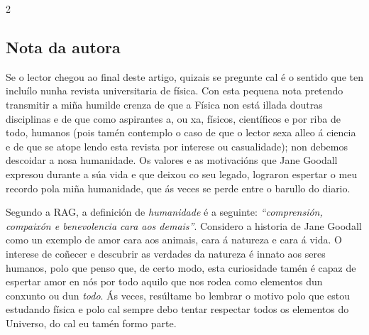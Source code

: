 \begin{multicols}{2}

\subsection*{Nota da autora}

Se o lector chegou ao final deste artigo, quizais se pregunte cal é o sentido
que ten incluílo nunha revista universitaria de física. Con esta pequena nota
pretendo transmitir a miña humilde crenza de que a Física non está illada
doutras disciplinas e de que como aspirantes a, ou xa, físicos, científicos e
por riba de todo, humanos (pois tamén contemplo o caso de que o lector sexa
alleo á ciencia e de que se atope lendo esta revista por interese ou
casualidade); non debemos descoidar a nosa humanidade. Os valores e as
motivacións que Jane Goodall expresou durante a súa vida e que deixou co seu
legado, lograron espertar o meu recordo pola miña humanidade, que ás veces se
perde entre o barullo do diario.

Segundo a RAG, a definición de \textit{humanidade} é a
seguinte: \textit{``comprensión, compaixón e benevolencia cara aos
demais''}. Considero a historia de Jane Goodall como un exemplo de
amor cara aos animais, cara á natureza e cara á vida. O interese de
coñecer e descubrir as verdades da natureza é innato aos seres
humanos, polo que penso que, de certo modo, esta curiosidade tamén é
capaz de espertar amor en nós por todo aquilo que nos rodea como
elementos dun conxunto ou dun \textit{todo}. Ás veces, resúltame bo
lembrar o motivo polo que estou estudando física e polo cal sempre
debo tentar respectar todos os elementos do Universo, do cal eu tamén
formo parte.

\nocite{youtube_lastInterview}
\nocite{youtube_insideLook}
\nocite{youtube_discussingBehavior}
\nocite{goodall_wikipedia}
\nocite{bbc_horizon}

\printbibliography

\end{multicols}
